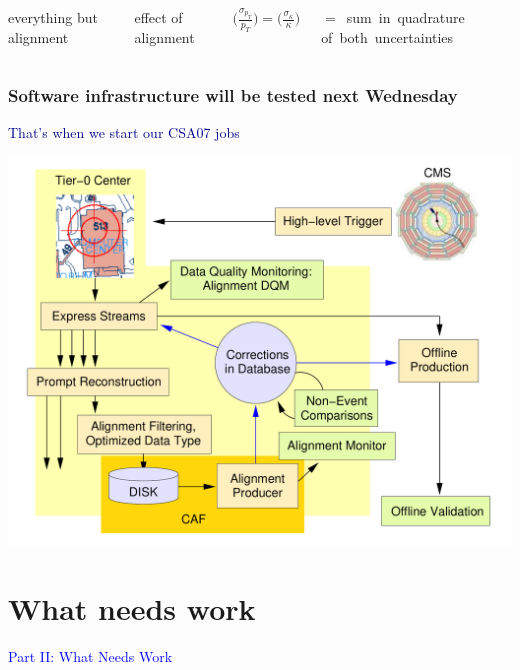 \documentclass[compress]{beamer}
\begin{document}
\begin{frame}
\begin{columns}
everything but alignment

\vspace{1.5 cm}
effect of alignment

\vspace{1.5 cm}
$\displaystyle \bigg(\frac{\sigma_{p_T}}{p_T}\bigg) = \bigg(\frac{\sigma_\kappa}{\kappa}\bigg)$

\vspace{0.1 cm}
\mbox{$=$ sum in quadrature} \mbox{of both uncertainties}
\end{columns}
\end{frame}

\begin{frame}
\frametitle{Software infrastructure will be tested next Wednesday}
\textcolor{darkblue}{That's when we start our CSA07 jobs}

\begin{center}
\includegraphics[width=0.75\linewidth]{grand_diagram.pdf}
\end{center}
\end{frame}

\section*{What needs work}

\begin{frame}
\begin{center}
\Huge \textcolor{blue}{\sc Part II: What Needs Work}
\end{center}
\end{frame}
\end{document}
